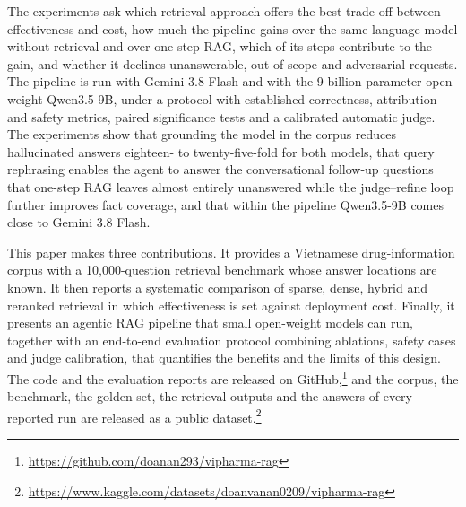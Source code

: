 The experiments ask which retrieval approach offers the best trade-off between effectiveness and cost, how much the pipeline gains over the same language model without retrieval and over one-step RAG, which of its steps contribute to the gain, and whether it declines unanswerable, out-of-scope and adversarial requests. The pipeline is run with Gemini 3.8 Flash and with the 9-billion-parameter open-weight Qwen3.5-9B, under a protocol with established correctness, attribution and safety metrics, paired significance tests and a calibrated automatic judge. The experiments show that grounding the model in the corpus reduces hallucinated answers eighteen- to twenty-five-fold for both models, that query rephrasing enables the agent to answer the conversational follow-up questions that one-step RAG leaves almost entirely unanswered while the judge--refine loop further improves fact coverage, and that within the pipeline Qwen3.5-9B comes close to Gemini 3.8 Flash.

This paper makes three contributions. It provides a Vietnamese drug-information corpus with a 10{,}000-question retrieval benchmark whose answer locations are known. It then reports a systematic comparison of sparse, dense, hybrid and reranked retrieval in which effectiveness is set against deployment cost. Finally, it presents an agentic RAG pipeline that small open-weight models can run, together with an end-to-end evaluation protocol combining ablations, safety cases and judge calibration, that quantifies the benefits and the limits of this design. The code and the evaluation reports are released on GitHub,\footnote{\url{https://github.com/doanan293/vipharma-rag}} and the corpus, the benchmark, the golden set, the retrieval outputs and the answers of every reported run are released as a public dataset.\footnote{\url{https://www.kaggle.com/datasets/doanvanan0209/vipharma-rag}}
